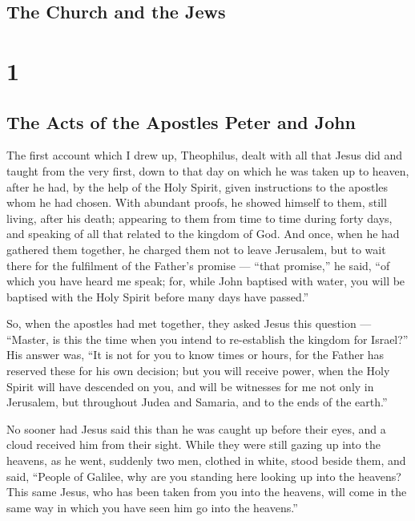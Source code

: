 \hypertarget{the-church-and-the-jews}{%
\subsection{The Church and the Jews}\label{the-church-and-the-jews}}

\hypertarget{section}{%
\section{1}\label{section}}

\hypertarget{the-acts-of-the-apostles-peter-and-john}{%
\subsection{The Acts of the Apostles Peter and
John}\label{the-acts-of-the-apostles-peter-and-john}}

 The first account which I drew up, Theophilus, dealt with
all that Jesus did and taught from the very first,  down to
that day on which he was taken up to heaven, after he had, by the help
of the Holy Spirit, given instructions to the apostles whom he had
chosen.  With abundant proofs, he showed himself to them,
still living, after his death; appearing to them from time to time
during forty days, and speaking of all that related to the kingdom of
God.  And once, when he had gathered them together, he
charged them not to leave Jerusalem, but to wait there for the
fulfilment of the Father's promise --- ``that promise,'' he said, ``of
which you have heard me speak;  for, while John baptised
with water, you will be baptised with the Holy Spirit before many days
have passed.''

 So, when the apostles had met together, they asked Jesus
this question --- ``Master, is this the time when you intend to
re-establish the kingdom for Israel?''  His answer was, ``It
is not for you to know times or hours, for the Father has reserved these
for his own decision;  but you will receive power, when the
Holy Spirit will have descended on you, and will be witnesses for me not
only in Jerusalem, but throughout Judea and Samaria, and to the ends of
the earth.''

 No sooner had Jesus said this than he was caught up before
their eyes, and a cloud received him from their sight. 
While they were still gazing up into the heavens, as he went, suddenly
two men, clothed in white, stood beside them,  and said,
``People of Galilee, why are you standing here looking up into the
heavens? This same Jesus, who has been taken from you into the heavens,
will come in the same way in which you have seen him go into the
heavens.''

